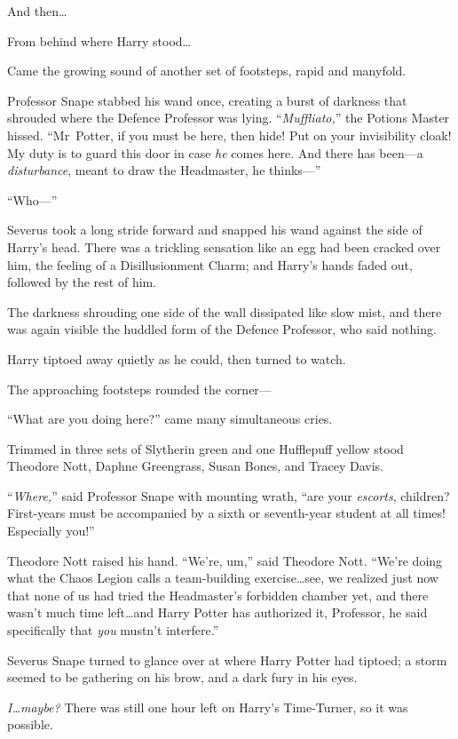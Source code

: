 And then…

From behind where Harry stood…

Came the growing sound of another set of footsteps, rapid and manyfold.

Professor Snape stabbed his wand once, creating a burst of darkness that shrouded where the Defence Professor was lying. “\emph{Muffliato,}” the Potions Master hissed.
“Mr~Potter, if you must be here, then hide! Put on your invisibility cloak! My duty is to guard this door in case \emph{he} comes here. And there has been—a \emph{disturbance}, meant to draw the Headmaster, he thinks—”

“Who—”

Severus took a long stride forward and snapped his wand against the side of Harry’s head. There was a trickling sensation like an egg had been cracked over him, the feeling of a Disillusionment Charm; and Harry’s hands faded out, followed by the rest of him.

The darkness shrouding one side of the wall dissipated like slow mist, and there was again visible the huddled form of the Defence Professor, who said nothing.

Harry tiptoed away quietly as he could, then turned to watch.

The approaching footsteps rounded the corner—

“What are you doing here?” came many simultaneous cries.

Trimmed in three sets of Slytherin green and one Hufflepuff yellow stood Theodore Nott, Daphne Greengrass, Susan Bones, and Tracey Davis.

“\emph{Where,}” said Professor Snape with mounting wrath, “are your \emph{escorts}, children? First-years must be accompanied by a sixth or seventh-year student at all times! Especially you!”

Theodore Nott raised his hand.
“We’re, um,” said Theodore Nott.
“We’re doing what the Chaos Legion calls a team-building exercise…see, we realized just now that none of us had tried the Headmaster’s forbidden chamber yet, and there wasn’t much time left…and Harry Potter has authorized it, Professor, he said specifically that \emph{you} mustn’t interfere.”

Severus Snape turned to glance over at where Harry Potter had tiptoed; a storm seemed to be gathering on his brow, and a dark fury in his eyes.

\emph{I…maybe?} There was still one hour left on Harry’s Time-Turner, so it was possible.

